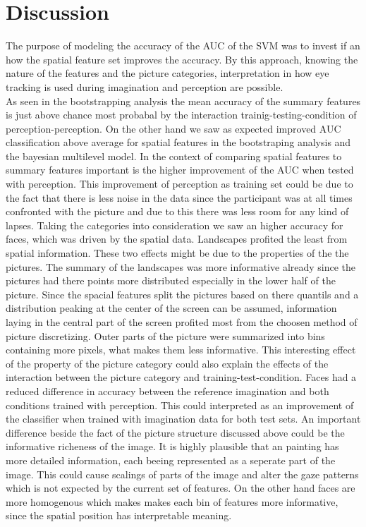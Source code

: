 \documentclass[a4paper,man,natbib,floatsintext]{apa6}
\begin{document}
\section{Discussion}
The purpose of modeling the accuracy of the AUC of the SVM was to invest if an how the spatial feature set improves the accuracy. By this approach, knowing the nature of the features and the picture categories, interpretation in how eye tracking is used during imagination and perception are possible. \\
As seen in the bootstrapping analysis the mean accuracy of the summary features is just above chance most probabal by the interaction trainig-testing-condition of perception-perception.
On the other hand we saw as expected improved AUC classification above average for spatial features in the bootstraping analysis and the bayesian multilevel model.
In the context of comparing spatial features to summary features important is the higher improvement of the AUC when tested with perception. This improvement of perception as training set could be due to the fact that there is less noise in the data since the participant was at all times confronted with the picture and due to this there was less room for any kind of lapses.
Taking the categories into consideration we saw an higher accuracy for faces, which was driven by the spatial data. Landscapes profited the least from spatial information. These two effects might be due to the properties of the the pictures. The summary of the landscapes was more informative already since the pictures had there points more distributed especially in the lower half of the picture. Since the spacial features split the pictures based on there quantils and a distribution peaking at the center of the screen can be assumed, information laying in the central part of the screen profited most from the choosen method of picture discretizing. Outer parts of the picture were summarized into bins containing more pixels, what makes them less informative. 
This interesting effect of the property of the picture category could also explain the effects of the interaction between the picture category and training-test-condition. Faces had a reduced difference in accuracy between the reference imagination and both conditions trained with perception. This could interpreted as an improvement of the classifier when trained with imagination data for both test sets. An important difference beside the fact of the picture structure discussed above could be the informative richeness of the image. It is highly plausible that an painting has more detailed information, each beeing represented as a seperate part of the image. This could cause scalings of parts of the image and alter the gaze patterns which is not expected by the current set of features. On the other hand faces are more homogenous which makes makes each bin of features more informative, since the spatial position has interpretable meaning. \\
\end{document}

